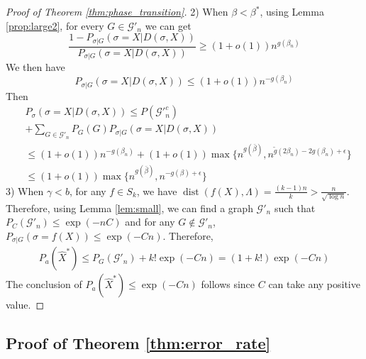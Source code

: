 \documentclass[entropy,article,submit,moreauthors,pdftex]{Definitions/mdpi}
\newcommand{\cG}{\mathcal{G}}
\newcommand{\1}{\mathbbm{1}}
\DeclareMathOperator{\Dist}{dist}
\begin{document}
\begin{proof}[Proof of Theorem \ref{thm:phase_transition}]
	2) When $\beta < \beta^*$, using Lemma \ref{prop:large2}, for every $G \in \cG'_n$
	we can get
	$$
	\frac{1-P_{\sigma | G}(\sigma=X | D(\sigma, X))}{P_{\sigma | G}(\sigma=X | D(\sigma, X))}\geq (1+o(1))n^{g(\beta_n)}
	$$
	We then have
	$$
	P_{\sigma | G}(\sigma=X| D(\sigma, X)) \leq (1+o(1)) n^{-g(\beta_n)}
	$$
	Then
	\begin{align*}
	&P_{\sigma}(\sigma=X| D(\sigma, X))  \leq  P(\cG'^c_n) \\
	&+ \sum_{G\in \cG'_n}P_G(G) P_{\sigma|G}(\sigma=X| D(\sigma, X)) \\
	& \leq (1+o(1))n^{-g(\beta_n)} + (1+o(1)) \max\{n^{g(\bar{\beta})}, n^{\tilde{g}(2\beta_n) - 2g(\beta_n) + \epsilon} \}\\
	& \leq (1+o(1)) \max\{n^{g(\bar{\beta})}, n^{-g(\beta) + \epsilon}  \}
	\end{align*}
	3) When $\gamma < b$, for any $f\in S_k$, we have $\Dist(f(X), \Lambda) = \frac{(k-1)n}{k} > \frac{n}{\sqrt{\log n}}$.
	Therefore, using Lemma \ref{lem:small}, we can find a graph $\cG'_n$ such that $P_C(\cG'_n) \leq \exp(-nC)$
	and for any $G\not \in \cG'_n$, $P_{\sigma |G}(\sigma = f(X)) \leq \exp(-Cn)$. Therefore,
	\begin{align*}
	P_a(\hat{X}^*) \leq P_G(\cG'_n) + k! \exp(-Cn) = (1+k!)\exp(-Cn)
	\end{align*}
	The conclusion of $P_a(\hat{X}^*) \leq \exp(-Cn)$ follows since $C$ can take any positive value.
\end{proof}

\subsection{Proof of Theorem \ref{thm:error_rate}}
\end{document}
